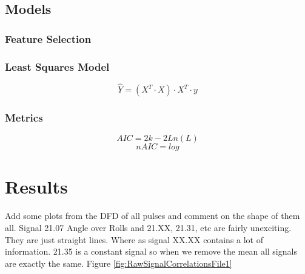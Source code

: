\documentclass{article}
\begin{document}
\subsection{Models}
\subsubsection{Feature Selection}
\subsubsection{Least Squares Model}
$$ \hat{Y} = (X^T \cdot X) \cdot X^T \cdot y $$
\subsubsection{Metrics}
$$ AIC = 2k - 2Ln(L) $$  
$$ nAIC = log $$
\clearpage  

\section{Results}
Add some plots from the DFD of all pulses and comment on the shape of them all.
Signal 21.07 Angle over Rolls and 21.XX, 21.31, etc are fairly unexciting. They are just straight lines.
Where as signal XX.XX contains a lot of information.
21.35 is a constant signal so when we remove the mean all signals are exactly the same.
Figure \ref{fig:RawSignalCorrelationsFile1}
\end{document}
